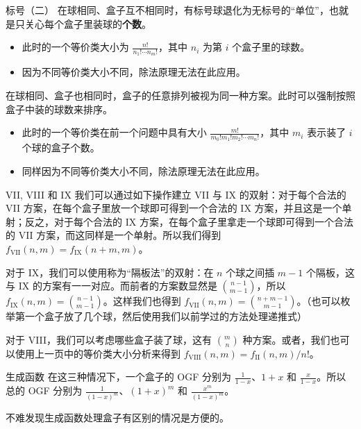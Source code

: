 \begin{frame}{标号（二）}
    在球相同、盒子互不相同时，有标号球退化为无标号的“单位”，也就是只关心每个盒子里装球的\textbf{个数}。
    \begin{itemize}
        \item 此时的一个等价类大小为 $\frac{n!}{n_1!\cdots n_m!}$，其中 $n_i$ 为第 $i$ 个盒子里的球数。
        \item 因为不同等价类大小不同，除法原理无法在此应用。
    \end{itemize} 

    在球相同、盒子也相同时，盒子的任意排列被视为同一种方案。此时可以强制按照盒子中装的球数来排序。
    \begin{itemize}
        \item 此时的一个等价类在前一个问题中具有大小 $\frac{m!}{m_0!m_1!m_2!\cdots m_n!}$，其中 $m_i$ 表示装了 $i$ 个球的盒子个数。
        \item 同样因为不同等价类大小不同，除法原理无法在此应用。
    \end{itemize}
\end{frame}
\begin{frame}{VII, VIII 和 IX}
    我们可以通过如下操作建立 VII 与 IX 的双射：对于每个合法的 VII 方案，在每个盒子里放一个球即可得到一个合法的 IX 方案，并且这是一个单射；反之，对于每个合法的 IX 方案，在每个盒子里拿走一个球即可得到一个合法的 VII 方案，而这同样是一个单射。所以我们得到 $f_{\mathrm{VII}}(n,m)=f_{\mathrm{IX}}(n+m,m)$。

    对于 IX，我们可以使用称为“隔板法”的双射：在 $n$ 个球之间插 $m-1$ 个隔板，这与 IX 的方案有一一对应。而前者的方案数显然是 $\binom{n-1}{m-1}$，所以 $f_{\mathrm{IX}}(n,m)=\binom{n-1}{m-1}$。这样我们也得到 $f_{\mathrm{VII}}(n,m)=\binom{n+m-1}{m-1}$。（也可以枚举第一个盒子放了几个球，然后使用我们以前学过的方法处理递推式）

    对于 VIII，我们可以考虑哪些盒子装了球，这有 $\binom{m}{n}$ 种方案。或者，我们也可以使用上一页中的等价类大小分析来得到 $f_{\mathrm{VIII}}(n,m)=f_{\mathrm{II}}(n,m)/n!$。
\end{frame}
\begin{frame}{生成函数}
    在这三种情况下，一个盒子的 OGF 分别为 $\frac{1}{1-x}$、$1+x$ 和 $\frac{x}{1-x}$。所以总的 OGF 分别为 $\frac{1}{(1-x)^m}$、$(1+x)^m$ 和 $\frac{x^m}{(1-x)^m}$。

    不难发现生成函数处理盒子有区别的情况是方便的。
\end{frame}
